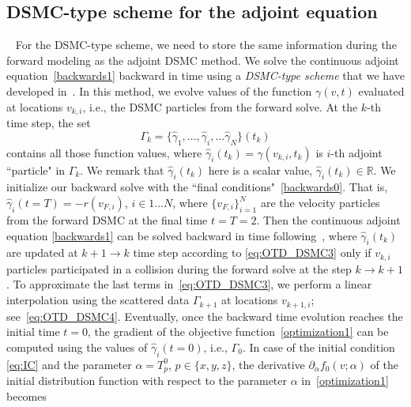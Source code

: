 \documentclass[times,final,nopreprintline]{elsarticle}
\newcommand{\bbR}{\mathbb R} \newcommand{\bbS}{\mathbb S}
\begin{document}







\subsection{DSMC-type scheme for the adjoint equation}~\label{sec:numeric_DSMCtype_method} 
For the DSMC-type scheme, we need to store the same information during the forward modeling as the adjoint DSMC method.
We solve the continuous adjoint equation~\eqref{backwards1} backward in time using a \textit{DSMC-type scheme} that we have developed in~. In this method, we evolve values of the function $\gamma(v,t)$ evaluated at locations $v_{k,i}$, i.e., the DSMC particles from the forward solve. At the $k$-th time step, the set
\begin{equation*}
\Gamma_{k} =\{\hat \gamma_1, \ldots , \hat \gamma_i,\ldots \hat \gamma_N\} (t_k)
\end{equation*}
contains all those function values, where $\hat \gamma_i(t_k)=\gamma(v_{k,i},t_k)$ is $i$-th adjoint ``particle" in $\Gamma_k$. We remark that $\hat \gamma_i(t_k)$ here is a scalar value, $\hat \gamma_i(t_k) \in \bbR$. 
We initialize our backward solve with the ``final conditions"~\eqref{backwards0}. That is, $\hat \gamma_i(t=T) = - r(v_{F,i})$, $i\in 1\dots N$, where $\{v_{F,i}\}_{i=1}^N$ are the velocity particles from the forward DSMC at the final time $t=T=2$.
Then the continuous adjoint equation \eqref{backwards1} can be solved backward in time following~, where $\hat \gamma_i(t_k)$ are updated at $k+1 \rightarrow k$ time step according to \eqref{eq:OTD_DSMC3} only if $v_{k,i}$ particles participated in a collision during the forward solve at the step $k \rightarrow k+1$. To approximate the last terms in~\eqref{eq:OTD_DSMC3}, we perform a linear interpolation using the scattered data $\Gamma_{k+1}$ at locations $v_{k+1,i}$; see~\eqref{eq:OTD_DSMC4}. 
Eventually, once the backward time evolution reaches the initial time $t=0$, the gradient of the objective function~\eqref{optimization1} can be computed using the values of $\hat \gamma_i(t=0)$, i.e., $\Gamma_0$.
In case of the initial condition \eqref{eq:IC} and the parameter $\alpha=T_p^0$, $p\in\{x,y,z\}$, the derivative $\partial_\alpha f_0(v;\alpha)$ of the initial distribution function with respect to the parameter $\alpha$ in~\eqref{optimization1} becomes  
\end{document}
